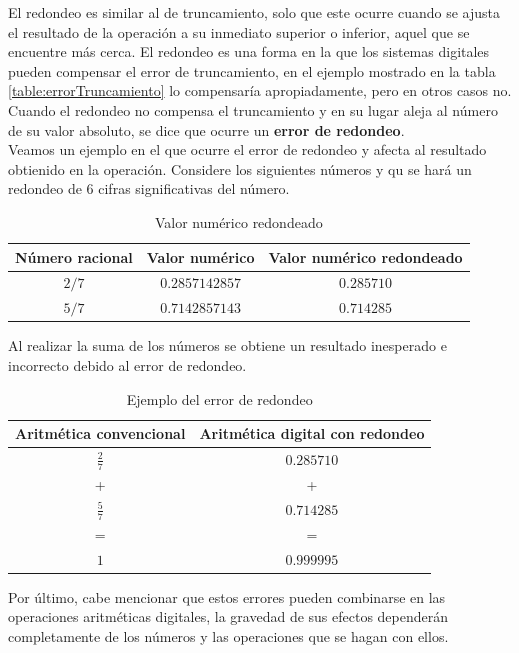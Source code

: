 El redondeo es similar al de truncamiento, solo que este ocurre cuando se ajusta el resultado de la operación a su inmediato superior o inferior, aquel que se
encuentre más cerca. El redondeo es una forma en la que los sistemas digitales pueden compensar el error de truncamiento, en el ejemplo mostrado en la tabla 
\ref{table:errorTruncamiento} lo compensaría apropiadamente, pero en otros casos no. Cuando el redondeo no compensa el truncamiento y en su lugar aleja al 
número de su valor absoluto, se dice que ocurre un \textbf{error de redondeo}. \\

Veamos un ejemplo en el que ocurre el error de redondeo y afecta al resultado obtienido en la operación. Considere los siguientes números y qu se hará
un redondeo de 6 cifras significativas del número.

\begin{table}[H]
	\centering
	\begin{tabular}{ccc}
		\toprule
		\textbf{Número racional} & \textbf{Valor numérico} & \textbf{Valor numérico redondeado}\\
		\midrule
		$2/7$ & $0.2857142857$ & $0.285710$\\
		$5/7$ & $0.7142857143$ & $0.714285$	\\
		\bottomrule
	\end{tabular}
	\caption{Valor numérico redondeado}
	\label{table:errorRedondeo}
\end{table}

Al realizar la suma de los números se obtiene un resultado inesperado e incorrecto debido al error de redondeo.

\begin{table}[H]
	\centering
	\begin{tabular}{cc}
		\toprule
		\textbf{Aritmética convencional} & \textbf{Aritmética digital con redondeo}\\
		\midrule
		$\frac{2}{7}$ & $0.285710$\\
		+ & + \\
		$\frac{5}{7}$ & $0.714285$\\
		= & = \\
		$1$ & $0.999995$		
	\end{tabular}
	\caption{Ejemplo del error de redondeo}
	\label{table:errorRedondeo2}
\end{table}

Por último, cabe mencionar que estos errores pueden combinarse en las operaciones aritméticas digitales, la gravedad de sus efectos dependerán completamente 
de los números y las operaciones que se hagan con ellos.


